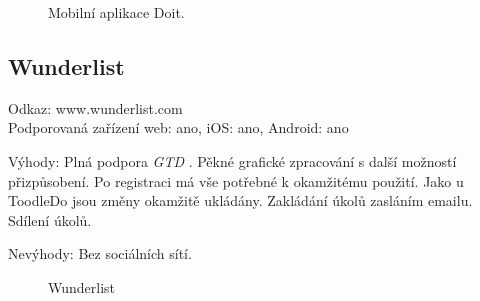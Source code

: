 \documentclass[thesis=B,czech]{FITthesis}[2012/06/26]
\newcommand{\GTD}{\textit{GTD }}
\begin{document}
\begin{figure}[h]
	\caption{Mobilní aplikace Doit.\cite{doit_overviewgram}}\label{fig:doit_overviewgram}
\end{figure}

\newpage

\subsection{Wunderlist}

Odkaz: www.wunderlist.com\\
Podporovaná zařízení web: ano, iOS: ano, Android: ano

Výhody:
Plná podpora \GTD. Pěkné grafické zpracování s další možností přizpůsobení. Po registraci má vše potřebné k okamžitému použití. Jako u ToodleDo jsou změny okamžitě ukládány. Zakládání úkolů zasláním emailu. Sdílení úkolů.

Nevýhody:
Bez sociálních sítí. 


\begin{figure}[h]
	\caption{Wunderlist \cite{wunderlist_overview}}\label{fig:wunderlist_overview}
\end{figure}
\end{document}
